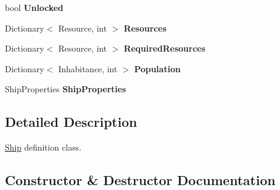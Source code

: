 \begin{DoxyCompactItemize}
\item 
\hypertarget{class_ship_ad3e1ad39a10c09f2ff3d9e67a3df288e}{}bool {\bfseries Unlocked}\label{class_ship_ad3e1ad39a10c09f2ff3d9e67a3df288e}

\item 
\hypertarget{class_ship_a0e5068b43ba79e25e3d6ece3a5b79527}{}Dictionary$<$ Resource, int $>$ {\bfseries Resources}\label{class_ship_a0e5068b43ba79e25e3d6ece3a5b79527}

\item 
\hypertarget{class_ship_afee1d15f928804cddb698f591231dace}{}Dictionary$<$ Resource, int $>$ {\bfseries Required\+Resources}\label{class_ship_afee1d15f928804cddb698f591231dace}

\item 
\hypertarget{class_ship_a0c439a5143b6134ed179337b5fa3e81b}{}Dictionary$<$ Inhabitance, int $>$ {\bfseries Population}\label{class_ship_a0c439a5143b6134ed179337b5fa3e81b}

\item 
\hypertarget{class_ship_a3388467724834569f66cdc95e091292b}{}Ship\+Properties {\bfseries Ship\+Properties}\label{class_ship_a3388467724834569f66cdc95e091292b}

\end{DoxyCompactItemize}


\subsection{Detailed Description}
\hyperlink{class_ship}{Ship} definition class. 



\subsection{Constructor \& Destructor Documentation}
\hypertarget{class_ship_aebcc555eb1057469c19efbcdf85ed5c8}{}
